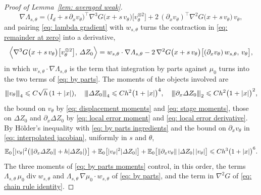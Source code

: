 \documentclass[namedate,webpdf,imanum]{ima-authoring-template}
\newcommand{\pnorm}[1]{{\vert\kern-0.25ex\vert\kern-0.25ex\vert} #1 {\vert\kern-0.25ex\vert\kern-0.25ex\vert}}
\newcommand{\Le}{\leqslant}
\theoremstyle{thmstyletwo}
\numberwithin{equation}{section}
\begin{document}
\begin{proof}[Proof of Lemma~\ref{lem: averaged weak}]
\begin{equation}
        \nabla \Lambda_{s,\theta} = \bigl( I_d + s\, \partial_x v_\theta \bigr)^{\!\top} \nabla^3 G\bigl( x + s\, v_\theta \bigr) \bigl[ v_\theta^{\otimes 2} \bigr]
        + 2\, (\partial_x v_\theta)^{\!\top} \nabla^2 G\bigl( x + s\, v_\theta \bigr)\, v_\theta ,
        \label{eq: lambda gradient}
    \end{equation}
    and pairing \eqref{eq: lambda gradient} with $w_{s,\theta}$ turns the contraction in \eqref{eq: remainder at zero} into a derivative,
    \begin{equation}
        \Bigl\langle \nabla^3 G\bigl( x + s\, v_\theta \bigr) \bigl[ v_\theta^{\otimes 2} \bigr] ,\, \Delta Z_0 \Bigr\rangle
        = w_{s,\theta} \cdot \nabla \Lambda_{s,\theta} - 2\, \nabla^2 G\bigl( x + s\, v_\theta \bigr) \bigl[ (\partial_x v_\theta)\, w_{s,\theta} ,\, v_\theta \bigr] ,
        \label{eq: chain rule identity}
    \end{equation}
    in which $w_{s,\theta} \cdot \nabla \Lambda_{s,\theta}$ is the term that integration by parts against $\mu_0$ turns into the two terms of \eqref{eq: by parts}. The moments of the objects involved are
    \begin{equation}
        \pnorm{v_\theta}_4 \Le C \sqrt h\, (1 + |x|) , \quad
        \pnorm{\Delta Z_0}_4 \Le C h^2 \bigl( 1 + |x| \bigr)^4 , \quad
        \pnorm{\partial_x \Delta Z_0}_2 \Le C h^2 \bigl( 1 + |x| \bigr)^2 ,
        \label{eq: by parts ingredients}
    \end{equation}
    the bound on $v_\theta$ by \eqref{eq: displacement moments} and \eqref{eq: stage moments}, those on $\Delta Z_0$ and $\partial_x \Delta Z_0$ by \eqref{eq: local error moment} and \eqref{eq: local error derivative}. By H\"older's inequality with \eqref{eq: by parts ingredients} and the bound on $\partial_x v_\theta$ in \eqref{eq: interpolated jacobian}, uniformly in $s$ and $\theta$,
    \begin{equation}
        \mathbb E_0 \bigl[ |v_\theta|^2 \bigl( \norm{\partial_x \Delta Z_0} + h |\Delta Z_0| \bigr) \bigr] + \mathbb E_0 \bigl[ |v_\theta|^2 |\Delta Z_0| \bigr] + \mathbb E_0 \bigl[ \norm{\partial_x v_\theta}\, |\Delta Z_0|\, |v_\theta| \bigr]
        \Le C h^3 \bigl( 1 + |x| \bigr)^6 .
        \label{eq: by parts moments}
    \end{equation}
    The three moments of \eqref{eq: by parts moments} control, in this order, the terms $\Lambda_{s,\theta}\, \mu_0 \operatorname{div} w_{s,\theta}$ and $\Lambda_{s,\theta}\, \nabla \mu_0 \cdot w_{s,\theta}$ of \eqref{eq: by parts}, and the term in $\nabla^2 G$ of \eqref{eq: chain rule identity}.


\end{proof}
\end{document}
